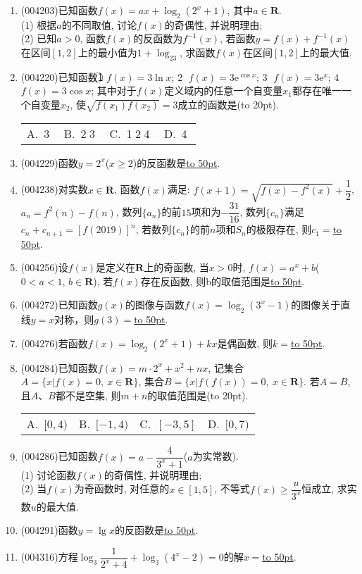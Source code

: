 \documentclass[10pt,a4paper]{article}
\newcommand{\blank}[1]{\underline{\hbox to #1pt{}}}
\newcommand{\bracket}[1]{(\hbox to #1pt{})}
\newcommand{\fourch}[4]{\par\begin{tabular}{p{.23\textwidth}p{.23\textwidth}p{.23\textwidth}p{.23\textwidth}}
A.~#1 &B.~#2& C.~#3& D.~#4
\end{tabular}}
\begin{document}
\begin{enumerate}[1.]
\item {\tiny (004203)}已知函数$f(x)=ax+\log_2(2^x+1)$, 其中$a\in \mathbf{R}$.\\
(1) 根据$a$的不同取值, 讨论$f(x)$的奇偶性, 并说明理由;\\
(2) 已知$a>0$, 函数$f(x)$的反函数为$f^{-1}(x)$, 若函数$y=f(x)+f^{-1}(x)$在区间$[1,2]$上的最小值为$1+\log_23$, 求函数$f(x)$在区间$[1,2]$上的最大值.
\item {\tiny (004220)}已知函数\textcircled{1} $f(x)=3\ln x$; \textcircled{2} $f(x)=3\mathrm{e}^{\cos x}$; \textcircled{3} $f(x)=3\mathrm{e}^x$; \textcircled{4} $f(x)=3\cos x$; 其中对于$f(x)$定义域内的任意一个自变量$x_1$都存在唯一一个自变量$x_2$, 使$\sqrt{f(x_1)f(x_2)}=3$成立的函数是\bracket{20}.
\fourch{\textcircled{3}}{\textcircled{2}\textcircled{3}}{\textcircled{1}\textcircled{2}\textcircled{4}}{\textcircled{4}}
\item {\tiny (004229)}函数$y=2^x$($x\ge 2$)的反函数是\blank{50}.
\item {\tiny (004238)}对实数$x\in \mathbf{R}$, 函数$f(x)$满足: $f(x+1)=\sqrt{f(x)-{f^2}(x)}+\dfrac 12$, $a_n=f^2(n)-f(n)$,
数列$\{a_n\}$的前$15$项和为$-\dfrac{31}{16}$, 数列$\{c_n\}$满足$c_n+c_{n+1}=[f(2019)]^n$, 若数列$\{c_n\}$的前$n$项和$S_n$的极限存在, 则$c_1=$\blank{50}.
\item {\tiny (004256)}设$f(x)$是定义在$\mathbf{R}$上的奇函数, 当$x>0$时, $f(x)=a^x+b$($0<a<1$, $b\in \mathbf{R}$), 若$f(x)$存在反函数, 则b的取值范围是\blank{50}.
\item {\tiny (004272)}已知函数$g(x)$的图像与函数$f(x)=\log_2(3^x-1)$的图像关于直线$y=x$对称，则$g(3)=$\blank{50}.
\item {\tiny (004276)}若函数$f(x)=\log_2(2^x+1)+kx$是偶函数, 则$k=$\blank{50}.
\item {\tiny (004284)}已知函数$f(x)=m\cdot 2^x+x^2+nx$, 记集合$A=\{x|f(x)=0, \ x\in \mathbf{R}\}$, 集合$B=\{x|f(f(x))=0, \ x\in \mathbf{R}\}$.
若$A=B$, 且$A$、$B$都不是空集, 则$m+n$的取值范围是\bracket{20}.
\fourch{$[0,4)$}{$[-1,4)$}{$[-3,5]$}{$[0,7)$}
\item {\tiny (004286)}已知函数$f(x)=a-\dfrac 4{3^x+1}$($a$为实常数).\\
(1) 讨论函数$f(x)$的奇偶性, 并说明理由;\\ 
(2) 当$f(x)$为奇函数时, 对任意的$x\in [1,5]$, 不等式$f(x)\ge \dfrac u{3^x}$恒成立, 求实数$u$的最大值.
\item {\tiny (004291)}函数$y=\lg x$的反函数是\blank{50}.
\item {\tiny (004316)}方程$\log_3\dfrac 1{2^x+4}+\log_3(4^x-2)=0$的解$x=$\blank{50}.

\end{enumerate}
\end{document}
